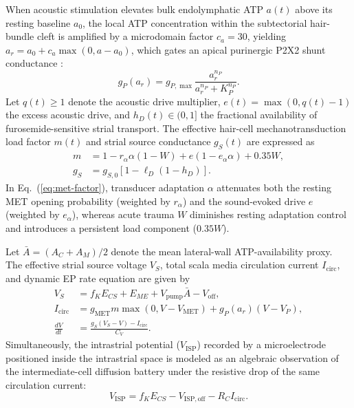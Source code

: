 \documentclass[final,5p,times]{elsarticle}
\begin{document}
When acoustic stimulation elevates bulk endolymphatic ATP \(a(t)\) above its resting baseline \(a_0\), the local ATP concentration within the subtectorial hair-bundle cleft is amplified by a microdomain factor \(c_a = 30\), yielding \(a_r = a_0 + c_a\max(0, a - a_0)\), which gates an apical purinergic P2X2 shunt conductance \citep{Munoz2001,Housley2013}:
\begin{equation}
  g_P(a_r) = g_{P,\max}\frac{a_r^{n_P}}{a_r^{n_P} + K_P^{n_P}}.
  \label{eq:gp}
\end{equation}
Let \(q(t) \ge 1\) denote the acoustic drive multiplier, \(e(t) = \max(0, q(t) - 1)\) the excess acoustic drive, and \(h_D(t) \in (0,1]\) the fractional availability of furosemide-sensitive strial transport. The effective hair-cell mechanotransduction load factor \(m(t)\) and strial source conductance \(g_S(t)\) are expressed as
\begin{align}
  m &= 1 - r_\alpha \alpha(1 - W) + e(1 - e_\alpha \alpha) + 0.35W, \label{eq:met-factor}\\
  g_S &= g_{S,0}\left[1 - \ell_D(1 - h_D)\right]. \label{eq:gs}
\end{align}
In Eq.~(\ref{eq:met-factor}), transducer adaptation \(\alpha\) attenuates both the resting MET opening probability (weighted by \(r_\alpha\)) and the sound-evoked drive \(e\) (weighted by \(e_\alpha\)), whereas acute trauma \(W\) diminishes resting adaptation control and introduces a persistent load component (\(0.35W\)).

Let \(\bar{A} = (A_C + A_M)/2\) denote the mean lateral-wall ATP-availability proxy. The effective strial source voltage \(V_S\), total scala media circulation current \(I_{\mathrm{circ}}\), and dynamic EP rate equation are given by
\begin{align}
  V_S &= f_K E_{CS} + E_{ME} + V_{\mathrm{pump}}\bar{A} - V_{\mathrm{off}}, \label{eq:vs}\\
  I_{\mathrm{circ}} &= g_{\mathrm{MET}} m \max(0, V - V_{\mathrm{MET}}) + g_P(a_r)(V - V_P), \label{eq:icirc}\\
  \frac{dV}{dt} &= \frac{g_S(V_S - V) - I_{\mathrm{circ}}}{C_V}. \label{eq:voltage}
\end{align}
Simultaneously, the intrastrial potential (\(V_{\mathrm{ISP}}\)) recorded by a microelectrode positioned inside the intrastrial space is modeled as an algebraic observation of the intermediate-cell diffusion battery under the resistive drop of the same circulation current:
\begin{equation}
  V_{\mathrm{ISP}} = f_K E_{CS} - V_{\mathrm{ISP,off}} - R_C I_{\mathrm{circ}}.
  \label{eq:isp}
\end{equation}
\end{document}
